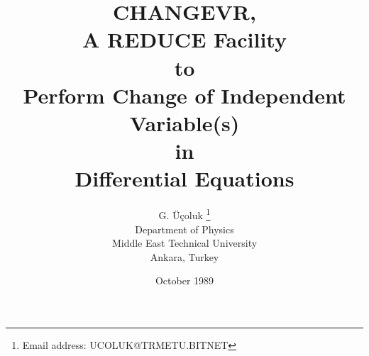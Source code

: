 \newcommand{\definedas}{\stackrel{\triangle}{=}}
\newcommand{\spc}{\;\;\;\;\;}
\newcommand{\mspc}{\;\;\;\;\;\;\;\;\;\;}
\newcommand{\lspc}{\;\;\;\;\;\;\;\;\;\;\;\;\;\;\;}


\renewcommand{\baselinestretch}{1.1}
\newcommand{\eg}[1]{\begin{quote}{\tt #1} \end{quote}}
\setlength{\textwidth}{15cm}
\addtolength{\oddsidemargin}{-1cm}

\title{                    CHANGEVR,  \\
                         A REDUCE Facility   \\
                              to   \\
                    Perform Change of Independent Variable(s)\\
                               in \\
                    Differential Equations\\[2cm]
        }
\author{
          G. \"{U}\c{c}oluk
             \thanks{Email address: UCOLUK@TRMETU.BITNET}
                     \\
                               Department of Physics \\
                               Middle East Technical University \\
                               Ankara, Turkey
       }
\date{October 1989}


\maketitle
\newpage

